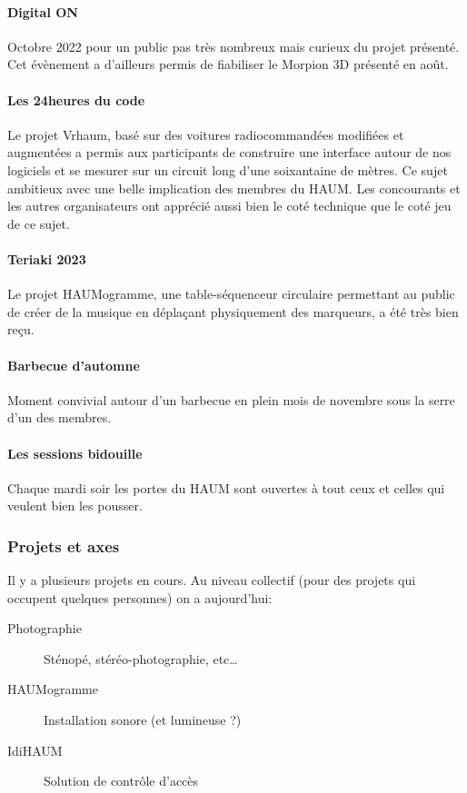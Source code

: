 \documentclass[a4paper, 11pt]{article}
\begin{document}
\begin{appendices}
\paragraph{Digital ON} Octobre 2022 pour un public pas très nombreux mais curieux du projet présenté. Cet évènement a d'ailleurs permis de fiabiliser le Morpion 3D présenté en août.

\paragraph{Les 24heures du code} Le projet Vrhaum, basé sur des voitures radiocommandées modifiées et augmentées a permis aux participants de construire une interface autour de nos logiciels et se mesurer sur un circuit long d'une soixantaine de mètres. Ce sujet ambitieux avec une belle implication des membres du HAUM. Les concourants et les autres organisateurs ont apprécié aussi bien le coté technique que le coté jeu de ce sujet.

\paragraph{Teriaki 2023} Le projet HAUMogramme, une table-séquenceur circulaire permettant au public de créer de la musique en déplaçant physiquement des marqueurs, a été très bien reçu.

\paragraph{Barbecue d'automne} Moment convivial autour d'un barbecue en plein mois de novembre sous la serre d'un des membres.

\paragraph{Les sessions bidouille} Chaque mardi soir les portes du HAUM sont ouvertes à tout ceux et celles qui veulent bien les pousser.

\subsubsection{Projets et axes}

Il y a plusieurs projets en cours. Au niveau collectif (pour des projets qui occupent
quelques personnes) on a aujourd'hui:

\begin{description}
	\item[Photographie] Sténopé, stéréo-photographie, etc\ldots
    \item[HAUMogramme] Installation sonore (et lumineuse ?)
	\item[IdiHAUM\footnotemark] Solution de contrôle d'accès
\end{description}


\end{appendices}
\end{document}
